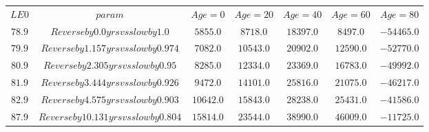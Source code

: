 \begin{tabular}{ccccccc}
$LE0$ & $param$ & $Age=0$ & $Age=20$ & $Age=40$ & $Age=60$ & $Age=80$\\
$78.9$ & $Reverse by 0.0 yrs vs slow by 1.0$ & $5855.0$ & $8718.0$ & $18397.0$ & $8497.0$ & $-54465.0$\\
$79.9$ & $Reverse by 1.157 yrs vs slow by 0.974$ & $7082.0$ & $10543.0$ & $20902.0$ & $12590.0$ & $-52770.0$\\
$80.9$ & $Reverse by 2.305 yrs vs slow by 0.95$ & $8285.0$ & $12334.0$ & $23369.0$ & $16783.0$ & $-49992.0$\\
$81.9$ & $Reverse by 3.444 yrs vs slow by 0.926$ & $9472.0$ & $14101.0$ & $25816.0$ & $21075.0$ & $-46217.0$\\
$82.9$ & $Reverse by 4.575 yrs vs slow by 0.903$ & $10642.0$ & $15843.0$ & $28238.0$ & $25431.0$ & $-41586.0$\\
$87.9$ & $Reverse by 10.131 yrs vs slow by 0.804$ & $15814.0$ & $23544.0$ & $38990.0$ & $46009.0$ & $-11725.0$\\
\end{tabular}

